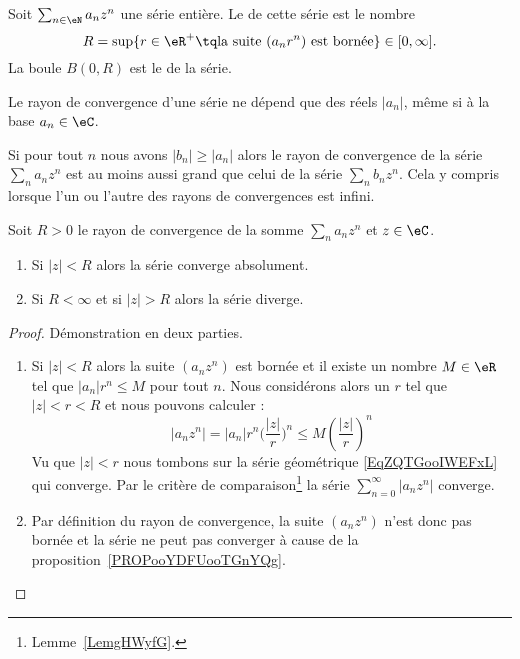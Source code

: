 \begin{definition}  \label{DefZWKOZOl}
    Soit \( \sum_{n\in \eN}a_nz^n\) une série entière. Le  de cette série est le nombre
    \begin{equation}
        R=\sup\{ r\in \eR^+\tq \text{la suite }(a_nr^n)\text{ est bornée} \}\in\mathopen[ 0 , \infty \mathclose].
    \end{equation}
    La boule \( B(0,R)\) est le  de la série.
\end{definition}
Le rayon de convergence d'une série ne dépend que des réels \( | a_n |\), même si à la base \( a_n\in \eC\).

\begin{remark}      \label{REMooYOTEooKvxHSf}
    Si pour tout \( n\) nous avons \( | b_n |\geq | a_n |\) alors le rayon de convergence de la série \( \sum_na_nz^n\) est au moins aussi grand que celui de la série \( \sum_nb_nz^n\). Cela y compris lorsque l'un ou l'autre des rayons de convergences est infini.
\end{remark}

\begin{lemma}   \label{LemmbWnFI}
    Soit \( R>0\) le rayon de convergence de la somme \( \sum_na_nz^n\) et \( z\in \eC\).
    \begin{enumerate}
        \item
            Si \( | z |<R\) alors la série converge absolument.
        \item
            Si \( R<\infty\) et si \( | z |>R\) alors la série diverge.
    \end{enumerate}
\end{lemma}

\begin{proof}
    Démonstration en deux parties.
    \begin{enumerate}
        \item

            Si \( | z |<R\) alors la suite \( (a_nz^n)\) est bornée et il existe un nombre \( M\in \eR\) tel que \( | a_n |r^n\leq M\) pour tout \( n\). Nous considérons alors un \( r\) tel que \( | z |<r<R\) et nous pouvons calculer :
            \begin{equation}
                | a_nz^n |=| a_n |r^n\big( \frac{ | z | }{ r } \big)^n\leq M\left( \frac{ | z | }{ r } \right)^n
            \end{equation}
            Vu que \( | z |<r\) nous tombons sur la série géométrique \eqref{EqZQTGooIWEFxL} qui converge. Par le critère de comparaison\footnote{Lemme~\ref{LemgHWyfG}.} la série \( \sum_{n=0}^{\infty}| a_nz^n |\) converge.

        \item
            Par définition du rayon de convergence, la suite \( (a_nz^n)\) n'est donc pas bornée et la série ne peut pas converger à cause de la proposition~\ref{PROPooYDFUooTGnYQg}.
    \end{enumerate}
\end{proof}

